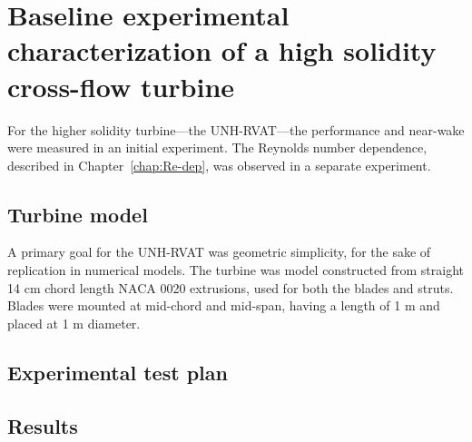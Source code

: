 \chapter{Baseline experimental characterization of a high solidity cross-flow
turbine}

For the higher solidity turbine---the UNH-RVAT---the performance and near-wake
were measured in an initial experiment. The Reynolds number dependence,
described in Chapter~\ref{chap:Re-dep}, was observed in a separate experiment.

\section{Turbine model}

A primary goal for the UNH-RVAT was geometric simplicity, for the sake of
replication in numerical models. The turbine was model constructed from straight
14 cm chord length NACA 0020 extrusions, used for both the blades and struts.
Blades were mounted at mid-chord and mid-span, having a length of 1 m and placed
at 1 m diameter.

\section{Experimental test plan}

\section{Results}